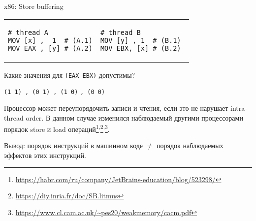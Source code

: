 \begin{frame}{x86: Store buffering}

\begin{tabular}{p{} p{}}
\begin{verbatim}
# thread A
MOV [x] ,  1  # (A.1)
MOV EAX , [y] # (A.2)
\end{verbatim}

& 

\begin{verbatim}
# thread B          
MOV [y] , 1  # (B.1) 
MOV EBX, [x] # (B.2) 
\end{verbatim}
\end{tabular}

Какие значения для \texttt{(EAX EBX)} допустимы?

  \texttt{(1 1)\ , (0 1)\ , (1 0)}
\pause
\texttt{, (0 0)}

\pause
Процессор может переупорядочить записи и чтения, если это не нарушает intra-thread order.
\pause
В данном случае изменился наблюдаемый другими процессорами порядок store и load операций\footnote<4->{\tiny\url{https://habr.com/ru/company/JetBrains-education/blog/523298/}}\textsuperscript{,}\footnote<4->{\tiny\url{https://diy.inria.fr/doc/SB.litmus}}\textsuperscript{,}\footnote<4->{\tiny\url{https://www.cl.cam.ac.uk/~pes20/weakmemory/cacm.pdf}}.

\pause
Вывод: порядок инструкций в машинном коде $\neq$ порядок наблюдаемых эффектов этих инструкций.

\end{frame}


